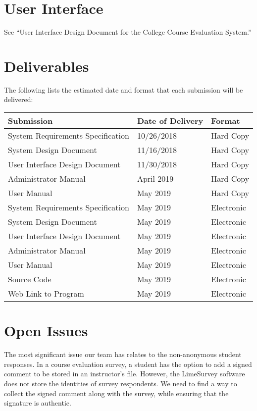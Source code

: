 \documentclass{article}
\begin{document}
\section{User Interface}

See ``User Interface Design Document for the College Course Evaluation System.''

\section{Deliverables}

The following lists the estimated date and format that each submission will be delivered:

\begin{center}
\begin{tabular}{|p{6cm}|p{3cm}|p{3cm}|} 
\hline
\textbf{Submission} & \textbf{Date of Delivery} & \textbf{Format} \\
\hline
System Requirements Specification & 10/26/2018 & Hard Copy\\ 
\hline
System Design Document & 11/16/2018 & Hard Copy\\ 
\hline
User Interface Design Document & 11/30/2018 & Hard Copy\\ 
\hline
Administrator Manual & April 2019 & Hard Copy\\ 
\hline
User Manual & May 2019 & Hard Copy\\ 
\hline
System Requirements Specification & May 2019 & Electronic\\ 
\hline
System Design Document & May 2019 & Electronic\\ 
\hline
User Interface Design Document & May 2019 & Electronic\\ 
\hline
Administrator Manual & May 2019 & Electronic\\ 
\hline
User Manual & May 2019 & Electronic\\ 
\hline
Source Code & May 2019 & Electronic\\ 
\hline
Web Link to Program & May 2019 & Electronic\\ 
\hline
\end{tabular}
\end{center}

\section{Open Issues}

The most significant issue our team has relates to the non-anonymous student responses. In a course evaluation survey, a student has the option to add a signed comment to be stored in an instructor's file. However, the LimeSurvey software does not store the identities of survey respondents. We need to find a way to collect the signed comment along with the survey, while ensuring that the signature is authentic.
\end{document}

